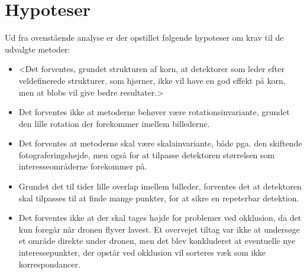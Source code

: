 \section{Hypoteser}
Ud fra ovenstående analyse er der opstillet følgende hypoteser om krav til de udvalgte metoder:
\begin{itemize}
\item{ <Det forventes, grundet strukturen af korn, at detektorer som leder efter veldefinerede strukturer, som hjørner, ikke vil have en god effekt på korn, men at blobs vil give bedre resultater.> }
\item{ Det forventes ikke at metoderne behøver være rotationsinvariante, grundet den lille rotation der forekommer imellem billederne. }
\item{Det forventes at metoderne skal være skalainvariante, både pga. den skiftende fotograferingshøjde, men også for at tilpasse detektoren størrelsen som interesseområderne forekommer på.}
\item{
Grundet det til tider lille overlap imellem billeder, forventes det at detektoren skal tilpasses til at finde mange punkter, for at sikre en repeterbar detektion.}
\item{Det forventes ikke at der skal tages højde for problemer ved okklusion, da det kun foregår når dronen flyver lavest. Et overvejet tiltag var ikke at undersøge et område direkte under dronen, men det blev konkluderet at eventuelle nye interessepunkter, der opstår ved okklusion vil sorteres væk som ikke korrespondancer.}
\end{itemize}